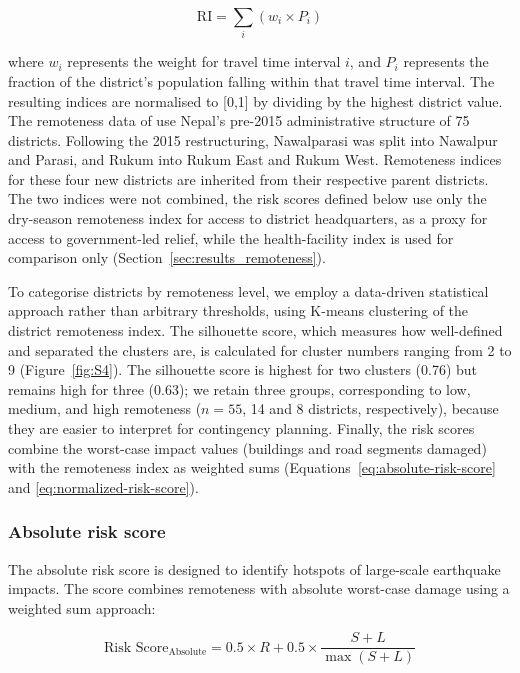 \documentclass[preprint,12pt,authoryear]{elsarticle}
\begin{document}
\begin{equation}
\label{eq:remoteness-index}
\text{RI} = \sum_{i} \left( w_{i} \times P_{i} \right)
\end{equation}

where $w_{i}$ represents the weight for travel time interval $i$, and $P_{i}$ represents the fraction of the district's population falling within that travel time interval. The resulting indices are normalised to [0,1] by dividing by the highest district value. The remoteness data of \cite{banick2019} use Nepal's pre-2015 administrative structure of 75 districts. Following the 2015 restructuring, Nawalparasi was split into Nawalpur and Parasi, and Rukum into Rukum East and Rukum West. Remoteness indices for these four new districts are inherited from their respective parent districts. The two indices were not combined, the risk scores defined below use only the dry-season remoteness index for access to district headquarters, as a proxy for access to government-led relief, while the health-facility index is used for comparison only (Section~\ref{sec:results_remoteness}).

To categorise districts by remoteness level, we employ a data-driven statistical approach rather than arbitrary thresholds, using K-means clustering of the district remoteness index. The silhouette score, which measures how well-defined and separated the clusters are, is calculated for cluster numbers ranging from 2 to 9 (Figure~\ref{fig:S4}). The silhouette score is highest for two clusters (0.76) but remains high for three (0.63); we retain three groups, corresponding to low, medium, and high remoteness ($n = 55$, 14 and 8 districts, respectively), because they are easier to interpret for contingency planning. Finally, the risk scores combine the worst-case impact values (buildings and road segments damaged) with the remoteness index as weighted sums (Equations~\ref{eq:absolute-risk-score} and \ref{eq:normalized-risk-score}).

\subsubsection{Absolute risk score}

The absolute risk score is designed to identify hotspots of large-scale earthquake impacts. The score combines remoteness with absolute worst-case damage using a weighted sum approach:

\begin{equation}
\label{eq:absolute-risk-score}
\text{Risk Score}_{\text{Absolute}} = 0.5 \times R + 0.5 \times \frac{S + L}{\max(S + L)}
\end{equation}
\end{document}
